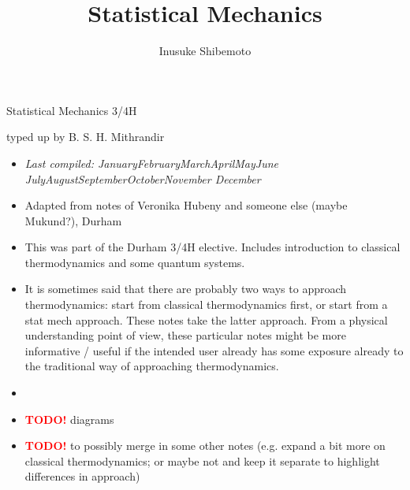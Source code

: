 \documentclass[letter-paper]{tufte-book}
\title{Statistical Mechanics}
\author[]{Inusuke Shibemoto}
\newcommand{\monthyear}{%
  \ifcase\month\or January\or February\or March\or April\or May\or June\or
  July\or August\or September\or October\or November\or
  December\fi\space\number\year
}
\newcommand{\TODO}{\textcolor{red}{\bf TODO!}\xspace}
\begin{document}



\chapter*{}

\begin{fullwidth}

\par \begin{center}{\Huge Statistical Mechanics 3/4H}\end{center}

\vspace*{5mm}

\par \begin{center}{\Large typed up by B. S. H. Mithrandir}\end{center}

\vspace*{5mm}

\begin{itemize}
  \item \textit{Last compiled: \monthyear}
  \item Adapted from notes of Veronika Hubeny and someone else (maybe Mukund?), Durham
  \item This was part of the Durham 3/4H elective. Includes introduction to
  classical thermodynamics and some quantum systems.
  \item It is sometimes said that there are probably two ways to approach
  thermodynamics: start from classical thermodynamics first, or start from a
  stat mech approach. These notes take the latter approach. From a physical
  understanding point of view, these particular notes might be more informative
  / useful if the intended user already has some exposure already to the
  traditional way of approaching thermodynamics.
  \item[]
  \item \TODO diagrams
  \item \TODO to possibly merge in some other notes (e.g. expand a bit more on
  classical thermodynamics; or maybe not and keep it separate to highlight
  differences in approach)
\end{itemize}


\end{fullwidth}
\end{document}
